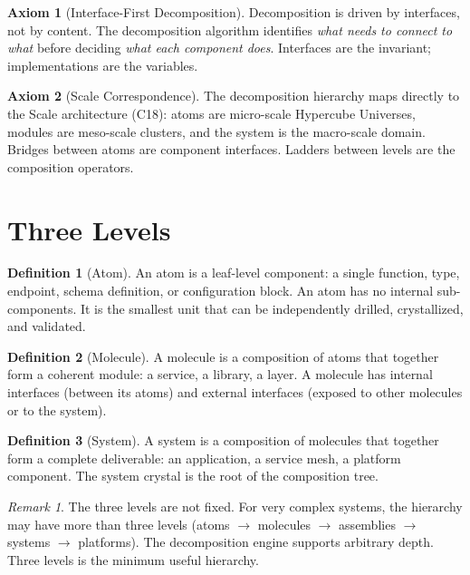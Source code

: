 \documentclass[11pt,a4paper,twoside]{article}
\theoremstyle{definition}
\newtheorem{definition}{Definition}[section]
\newtheorem{axiom}{Axiom}[section]
\theoremstyle{plain}
\theoremstyle{remark}
\newtheorem{remark}{Remark}[section]
\begin{document}
\begin{axiom}[Interface-First Decomposition]\label{ax:interface}
Decomposition is driven by interfaces, not by content. The
decomposition algorithm identifies \emph{what needs to connect to
what} before deciding \emph{what each component does}. Interfaces are
the invariant; implementations are the variables.
\end{axiom}

\begin{axiom}[Scale Correspondence]\label{ax:scalecorr}
The decomposition hierarchy maps directly to the Scale architecture
(C18): atoms are micro-scale Hypercube Universes, modules are
meso-scale clusters, and the system is the macro-scale domain.
Bridges between atoms are component interfaces. Ladders between
levels are the composition operators.
\end{axiom}


\section{Three Levels}\label{sec:levels}

\begin{definition}[Atom]\label{def:atom}
An atom is a leaf-level component: a single function, type, endpoint,
schema definition, or configuration block. An atom has no internal
sub-components. It is the smallest unit that can be independently
drilled, crystallized, and validated.
\end{definition}

\begin{definition}[Molecule]\label{def:molecule}
A molecule is a composition of atoms that together form a coherent
module: a service, a library, a layer. A molecule has internal
interfaces (between its atoms) and external interfaces (exposed to
other molecules or to the system).
\end{definition}

\begin{definition}[System]\label{def:system}
A system is a composition of molecules that together form a complete
deliverable: an application, a service mesh, a platform component.
The system crystal is the root of the composition tree.
\end{definition}

\begin{remark}
The three levels are not fixed. For very complex systems, the hierarchy
may have more than three levels (atoms $\to$ molecules $\to$ assemblies
$\to$ systems $\to$ platforms). The decomposition engine supports
arbitrary depth. Three levels is the minimum useful hierarchy.
\end{remark}
\end{document}
